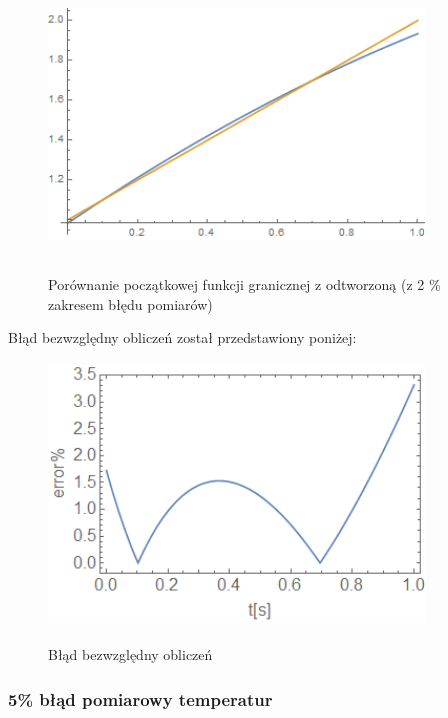 \documentclass[twoside]{projektInzynierskiMS1}
\begin{document}
\begin{figure}[H]
\begin{center}
		\includegraphics[height=7cm, width=10cm]{2reconstruction.png}\\
	\caption{Porównanie początkowej funkcji granicznej z odtworzoną (z 2 \% zakresem błędu pomiarów)}
\end{center}
\end{figure}

Błąd bezwzględny obliczeń został przedstawiony poniżej: \\

\begin{figure}[H]
\begin{center}
		\includegraphics[height=7cm, width=10cm]{2abs.png}\\
	\caption{Błąd bezwzględny obliczeń}
\end{center}
\end{figure}



\subsubsection{5\% błąd pomiarowy temperatur}
\end{document}
